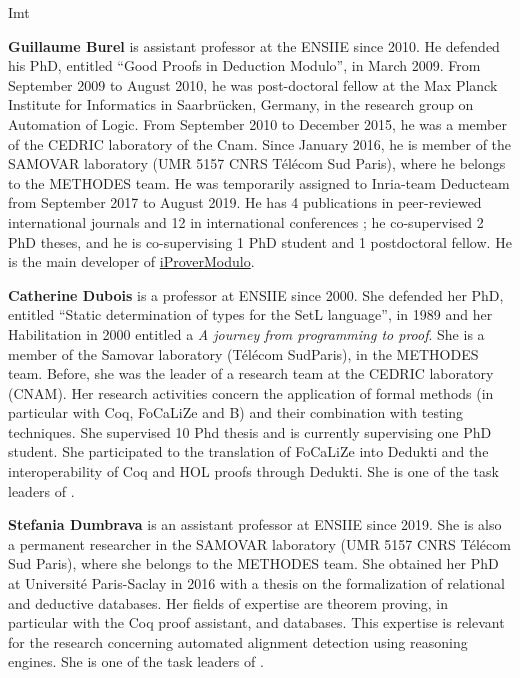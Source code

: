 \begin{sitedescription}{Imt}
\begin{compactitem}
\item{\bf Guillaume Burel}
 is
assistant professor at the ENSIIE since 2010. He defended his PhD,
entitled ``Good Proofs in Deduction Modulo'', in March 2009. From
September 2009 to August 2010, he was post-doctoral fellow at the Max
Planck Institute for Informatics in Saarbr\"ucken, Germany, in the
research group on Automation of Logic. From September 2010 to December
2015, he was a member of the CEDRIC laboratory of the Cnam. Since
January 2016, he is member of the SAMOVAR laboratory (UMR 5157 CNRS
T\'el\'ecom Sud Paris), where he belongs to the METHODES team. He was
temporarily assigned to Inria-team Deducteam from September 2017 to
August 2019.  He has 4
publications in peer-reviewed international journals and 12 in
international conferences ; he co-supervised 2 PhD theses, and he is
co-supervising 1 PhD student and 1 postdoctoral fellow. He is the
main developer of
\href{http://www.ensiie.fr/~guillaume.burel/blackandwhite_iProverModulo.html.en}{iProverModulo}.

\item {\bf Catherine Dubois} is a professor at ENSIIE since 2000. She defended her PhD, entitled ``Static determination of types for the SetL language'', in 1989 and her Habilitation in 2000 entitled a
\emph{A journey from programming to proof}. She is a
member of the Samovar laboratory (T\'el\'ecom
SudParis), in the METHODES team. Before, she was the leader of a research team at the CEDRIC laboratory (CNAM). Her research activities concern the application of formal methods (in particular with Coq, FoCaLiZe and B) and their combination with testing techniques. She supervised 10 Phd thesis and is currently supervising one PhD student. She participated to the translation of FoCaLiZe into Dedukti and the interoperability of Coq and HOL proofs through Dedukti.
She is one of the task leaders of .

\item{\bf Stefania Dumbrava}
is an assistant professor at ENSIIE since 2019. She is also a permanent researcher in the SAMOVAR laboratory (UMR 5157 CNRS T\'el\'ecom
Sud Paris), where she belongs to the METHODES team. She obtained her PhD at Universit\'e Paris-Saclay in 2016 with a thesis on the formalization
of relational and deductive databases. Her fields of expertise are theorem proving, in particular with the Coq proof assistant, and databases.
This expertise is relevant for the research concerning automated alignment detection using reasoning engines. She is one of the task leaders of .
\end{compactitem}


\end{sitedescription}

